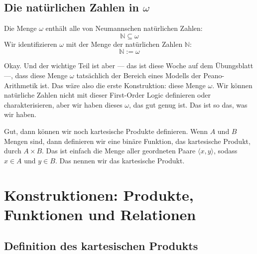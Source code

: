 \subsection{Die natürlichen Zahlen in \texorpdfstring{$\omega$}{omega}}
\begin{math-stroke}
\begin{remark}
Die Menge $\omega$ enthält alle von Neumannschen natürlichen Zahlen:
\[
\mathbb{N} \subseteq \omega
\]
Wir identifizieren $\omega$ mit der Menge der natürlichen Zahlen $\mathbb{N}$:
\[
\mathbb{N} := \omega
\]
\end{remark}
\end{math-stroke}

\begin{spoken-clean}[00:51:19 - 00:53:29]
Okay. Und der wichtige Teil ist aber --- das ist diese Woche auf dem Übungsblatt ---, dass diese Menge $\omega$ tatsächlich der Bereich eines Modells der Peano-Arithmetik ist. Das wäre also die erste Konstruktion: diese Menge $\omega$. Wir können natürliche Zahlen nicht mit dieser First-Order Logic definieren oder charakterisieren, aber wir haben dieses $\omega$, das gut genug ist. Das ist so das, was wir haben.

Gut, dann können wir noch kartesische Produkte definieren. Wenn $A$ und $B$ Mengen sind, dann definieren wir eine binäre Funktion, das kartesische Produkt, durch $A \times B$. Das ist einfach die Menge aller geordneten Paare $\langle x, y \rangle$, sodass $x \in A$ und $y \in B$. Das nennen wir das kartesische Produkt.
\end{spoken-clean}

\section{Konstruktionen: Produkte, Funktionen und Relationen}

\subsection{Definition des kartesischen Produkts}
\begin{math-stroke}
\end{math-stroke}


